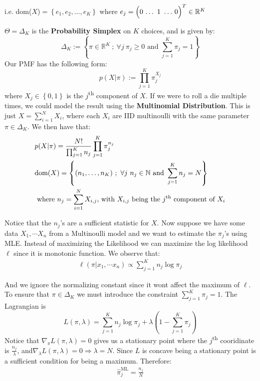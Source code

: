\documentclass[]{article}
\theoremstyle{mattstyle}
\theoremstyle{definition}
\begin{document}
i.e. dom($X$)\(= \left\{e_{1}, e_{2}, \ldots, e_{K}\right\}\) where \(e_{j} = \left(0\,\ldots\tikz[remember picture,baseline]{\node[anchor=base] (one-hot-1) {$1$};}\ldots\,0\right)^{T} \in \mathbb{R}^{K}\)

		
\hfill

$\Theta = \Delta_{K}$ is the \textbf{Probability Simplex} on $K$ choices, and is given by: 
$$\Delta_{K} := \left\{\pi \in \mathbb{R}^{K}\ ;\ \forall j\ \pi_{j} \geq 0 \text{ and } \sum_{j=1}^{K}\pi_{j} = 1\right\}$$
Our PMF has the following form:
$$p(X|\pi) := \prod_{j=1}^{K}\pi_{j}^{X_{j}}$$ where \(X_{j} \in \left\{0,1\right\}\) is the $j$\textsuperscript{th} component of $X$. If we were to roll a die multiple times, we could model the result using the \textbf{Multinomial Distribution}. This is just \(X = \sum_{i=1}^{N}X_{i}\), where each \(X_i\) are IID multinoulli with the same parameter $\pi\in\Delta_K$. We then have that:
\begin{align*}
&p(X|\pi) =  \frac{N!}{\prod_{j=1}^{K}n_j}\prod_{j=1}^{K}\pi_{j}^{n_{j}}\\ 
&\text{dom}(X) = \left\{(n_{1},\ldots,n_{K})\ ;\ \forall j\ n_{j} \in \mathbb{N} \text{ and } \sum_{j=1}^{K}n_{j} = N\right\}\\
&\text{ where $n_j = \sum_{i=1}^{N}X_{i,j}$, with $X_{i,j}$ being the $j$\textsuperscript{th} component of $X_i$}
\end{align*}

Notice that the $n_j$'s are a sufficient statistic for $X$. Now suppose we have some data $X_1, \cdots X_n$ from a Multinoulli model and we want to estimate the $\pi_j$'s using MLE. Instead of maximizing the Likelihood we can maximize the log likelihood $\ell$ since it is monotonic function. We observe that:
\begin{align*}
\ell(\pi|x_1, \cdots x_n) \propto \sum_{j=1}^{K}n_{j}\log \pi_{j}
\end{align*}

And we ignore the normalizing constant since it wont affect the maximum of $\ell$. To ensure that $\pi \in \Delta_K$ we must introduce the constraint  $\sum_{j=1}^{K}\pi_{j} = 1$. The Lagrangian is
$$L(\pi, \lambda) = \sum_{j=1}^{K}n_{j}\log \pi_{j} + \lambda \left(1 - \sum_{j=1}^{K}\pi_{j}\right)
$$ 
Notice that $\nabla_{\pi}L(\pi, \lambda) = 0$ gives us a stationary point where the $j$\textsuperscript{th} cooridinate is $\frac{n_{j}}{\lambda}$, and$\nabla_{\lambda}L(\pi, \lambda) = 0 \Rightarrow \lambda = N$. Since $L$ is concave being a stationary point is a sufficient condition for being a maximum. Therefore:
\begin{align*}
\boxed{\hat{\pi}_{j}^{\text{ML}} = \frac{n_{j}}{N}}
\label{eq:multinomial-MLE}
\end{align*}
\end{document}
